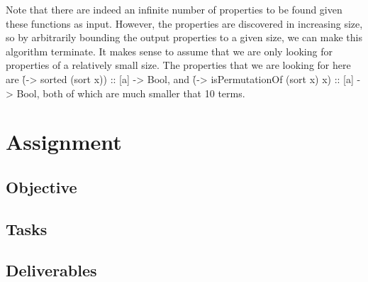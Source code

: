 \documentclass[a4paper, 11pt]{article}
\begin{document}
Note that there are indeed an infinite number of properties to be found given these functions as input.
However, the properties are discovered in increasing size, so by arbitrarily bounding the output properties to a given size, we can make this algorithm terminate.
It makes sense to assume that we are only looking for properties of a relatively small size.
The properties that we are looking for here are \h{(\x -> sorted (sort x)) :: [a] -> Bool}, and \h{(\x -> isPermutationOf (sort x) x) :: [a] -> Bool}, both of which are much smaller that 10 terms.


\section{Assignment}
\subsection{Objective}

\subsection{Tasks}


\subsection{Deliverables}



\end{document}

